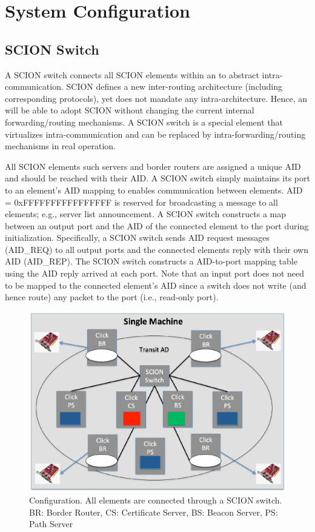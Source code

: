 \chapter{System Configuration}\label{sec:system-configuration}

\section{SCION Switch}
A SCION switch connects all SCION elements within an \AD to abstract intra-\AD communication. SCION defines a new inter-\AD routing architecture (including corresponding protocols), yet does not mandate any intra-\AD architecture. Hence, an \AD will be able to adopt SCION without changing the current internal forwarding/routing mechanisms. A SCION switch is a special element that virtualizes intra-\AD communication and can be replaced by intra-\AD forwarding/routing mechanisms in real operation.

All SCION elements such servers and border routers are assigned a unique AID and should be reached with their AID. A SCION switch simply maintains its port to an element's AID mapping to enables communication between elements. AID = 0xFFFFFFFFFFFFFFFF is reserved for broadcasting a message to all elements; e.g., server list announcement. A SCION switch constructs a map between an output port and the AID of the connected element to the port during initialization. Specifically, a SCION switch sends AID request messages (AID\_REQ) to all output ports and the connected elements reply with their own AID (AID\_REP). The SCION switch constructs a AID-to-port mapping table using the AID reply arrived at each port. Note that an input port does not need to be mapped to the connected element's AID since a switch does not write (and hence route) any packet to the port (i.e., read-only port).

\begin{figure}[ht]
\centering
\includegraphics[width=.8\columnwidth]{./fig/configuration.eps}
\caption{Configuration. All elements are connected through a SCION switch.\newline
BR: Border Router, CS: Certificate Server, BS: Beacon Server, PS: Path Server}\label{fig:configuration}
\end{figure}

